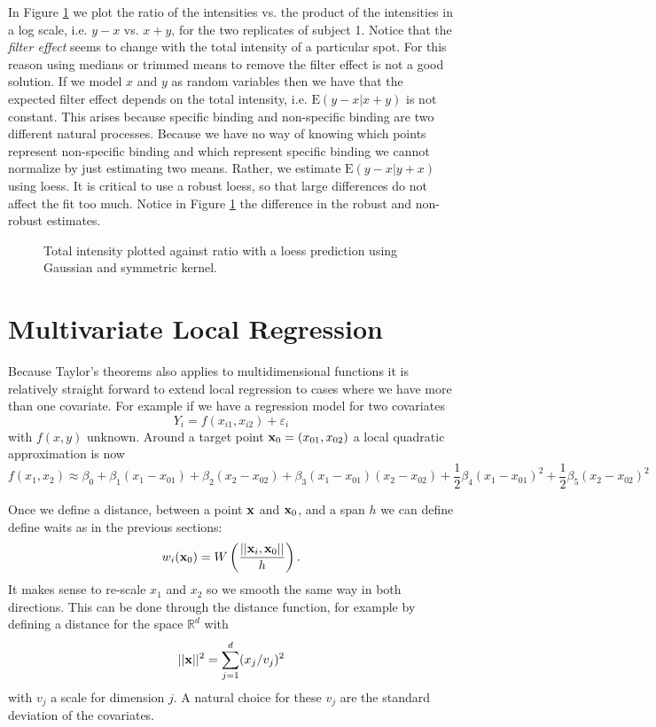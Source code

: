 In Figure \ref{f3.4} we plot the ratio of the intensities vs. the
product of the 
intensities in a log scale, i.e. $y-x$ vs. $x + y$, for the two
replicates of subject 1. Notice that the
{\it filter effect} seems to change with the total intensity of a
particular spot. For this reason using medians or trimmed
means to remove the filter effect is not a good solution. If we model $x$
and $y$ as random 
variables then we have that the expected filter effect depends on the
total intensity, i.e. $\mbox{E}(y - x | x+y )$ is not constant.
This arises because
specific binding and non-specific binding are two different natural
processes. Because we have no way of knowing which points represent
non-specific binding and which represent specific binding we cannot
normalize by just estimating two means. Rather, we estimate
$\mbox{E}(y-x|y+x)$ using loess. It is critical to use a robust loess,
so that large differences do not affect the fit too much. Notice in
Figure \ref{f3.4} the difference in the robust and non-robust
estimates.


\begin{figure}[htp]
\caption{\label{f3.4} Total intensity plotted against ratio with a
  loess prediction using Gaussian and symmetric kernel.}
\centerline{}
\end{figure}




\section{Multivariate Local Regression}
Because Taylor's theorems also applies to multidimensional functions it
is relatively straight forward to extend local regression to cases
where we have more than one covariate. For example if we have a
regression model for two covariates
\[
Y_i = f(x_{i1},x_{i2}) + \varepsilon_i
\]
with $f(x,y)$ unknown. Around a target point ${\mathbf x}_0 = (x_{01},x_{02})$
a  local quadratic approximation is now 
\[
f(x_1,x_2) \approx \beta_0 + \beta_1 (x_1 - x_{01}) + \beta_2 (x_2 - x_{02})
+ \beta_3 (x_1 - x_{01})(x_2 - x_{02}) + \frac{1}{2} \beta_4 (x_1 -
x_{01})^2 +  \frac{1}{2} \beta_5(x_2 -
x_{02})^2  
\]

Once we define a distance, between a point ${\mathbf x}$ and
${\mathbf x}_0$, and a span $h$ we can define define waits as in the previous
sections:
\[
w_i({\mathbf x}_0) = W\left(\frac{||{\mathbf x}_i,{\mathbf x}_0||}{h}\right).
\]
It makes sense to re-scale $x_1$ and $x_2$ so we smooth the same way
in both directions. This can be done through the distance function,
for example by defining a distance for the space ${\mathbb R}^d$ with
\[
||{\mathbf x} ||^2 = \sum_{j=1}^d (x_j/v_j)^2
\]
with $v_j$ a scale for dimension $j$. A natural choice for these $v_j$
are the standard deviation of the covariates.

